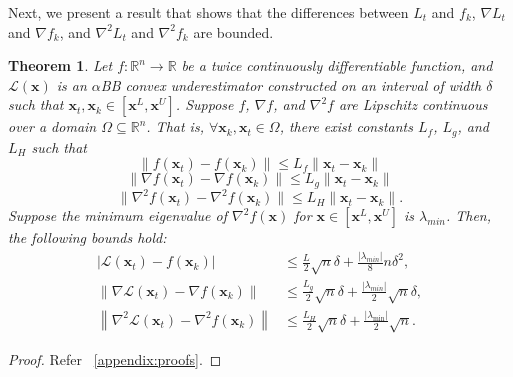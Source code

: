 \documentclass{elsarticle}
\newtheorem{theorem}{Theorem}
\numberwithin{equation}{section}
\begin{document}
Next, we present a result that shows that the differences between $L_t$ and $f_k$, $\nabla L_t$ and $\nabla f_k$, and $\nabla^2L_t$ and $\nabla^2 f_k$ are bounded. 
\begin{theorem}\label{theorem:theo1}
Let $f: \mathbb{R}^n \rightarrow \mathbb{R}$ be a twice continuously differentiable function, and $\mathcal{L}(\mathbf{x})$ is an $\alpha$BB convex underestimator constructed on an interval of width $\delta$ such that $\mathbf{x}_t, \mathbf{x}_k\in [\mathbf{x}^L, \mathbf{x}^U]$. Suppose $f$, $\nabla f$, and $\nabla^2 f$ are Lipschitz continuous over a domain $\Omega\subseteq \mathbb{R}^n$. That is, $\forall \mathbf{x}_k, \mathbf{x}_t \in \Omega$, there exist constants $L_f$, $L_g$, and $L_H$ such that
\begin{equation}\label{eq:lipsch_f}
    \|f(\mathbf{x}_t) - f(\mathbf{x}_k)\| \leq L_f \|\mathbf{x}_t - \mathbf{x}_k\|    
\end{equation}
\begin{equation}\label{eq:lipsch_g}
    \|\nabla f(\mathbf{x}_t) - \nabla f(\mathbf{x}_k)\| \leq L_g \|\mathbf{x}_t - \mathbf{x}_k\|    
\end{equation}
\begin{equation}\label{eq:lipsch_h}
    \|\nabla^2 f(\mathbf{x}_t) - \nabla^2 f(\mathbf{x}_k)\| \leq L_H \|\mathbf{x}_t - \mathbf{x}_k\|.
\end{equation}
Suppose the minimum eigenvalue of $\nabla^2 f(\mathbf{x})$ for $\mathbf{x}\in[\mathbf{x}^L, \mathbf{x}^U]$ is $\lambda_{min}$. Then, the following bounds hold:
\begin{align}
    \left| \mathcal{L}(\mathbf{x}_t) - f(\mathbf{x}_k) \right| & \leq \frac{L}{2} \sqrt{n} \delta + \frac{|\lambda_{min}|}{8} n \delta^2, \\
    \left\| \nabla \mathcal{L}(\mathbf{x}_t) - \nabla f(\mathbf{x}_k) \right\| &\leq \frac{L_g}{2} \sqrt{n} \delta + \frac{|\lambda_{min}|}{2} \sqrt{n}\delta, \\
    \left\| \nabla^2 \mathcal{L}(\mathbf{x}_t) - \nabla^2 f(\mathbf{x}_k) \right\| &\leq \frac{L_H}{2} \sqrt{n} \delta + \frac{|\lambda_{\min}|}{2} \sqrt{n}\label{boundlx}. 
\end{align}
\end{theorem}
\begin{proof}
Refer ~\ref{appendix:proofs}. 
\end{proof}
 
\end{document}
